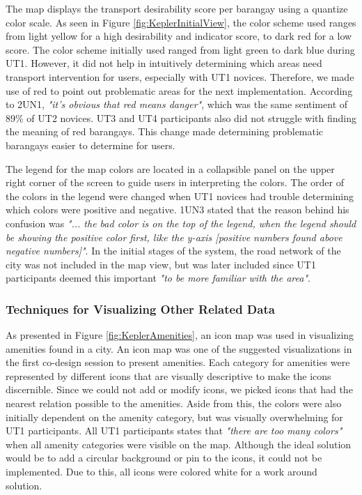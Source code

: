 \documentclass{sigchi}
\begin{document}
The map displays the transport desirability score per barangay using a quantize color scale. As seen in Figure \ref{fig:KeplerInitialView}, the color scheme used ranges from light yellow for a high desirability and indicator score, to dark red for a low score. The color scheme initially used ranged from light green to dark blue during UT1. However, it did not help in intuitively determining which areas need transport intervention for users, especially with UT1 novices. Therefore, we made use of red to point out problematic areas for the next implementation. According to 2UN1, \textit{"it's obvious that red means danger"}, which was the same sentiment of 89\% of UT2 novices. UT3 and UT4 participants also did not struggle with finding the meaning of red barangays. This change made determining problematic barangays easier to determine for users. 

The legend for the map colors are located in a collapsible panel on the upper right corner of the screen to guide users in interpreting the colors. The order of the colors in the legend were changed when UT1 novices had trouble determining which colors were positive and negative. 1UN3 stated that the reason behind his confusion was \textit{"... the bad color is on the top of the legend, when the legend should be showing the positive color first, like the y-axis [positive numbers found above negative numbers]"}. In the initial stages of the system, the road network of the city was not included in the map view, but was later included since UT1 participants deemed this important \textit{"to be more familiar with the area"}.

\subsubsection{Techniques for Visualizing Other Related Data}
As presented in Figure \ref{fig:KeplerAmenities}, an icon map was used in visualizing amenities found in a city. An icon map was one of the suggested visualizations in the first co-design session to present amenities. Each category for amenities were represented by different icons that are visually descriptive to make the icons discernible. Since we could not add or modify icons, we picked icons that had the nearest relation possible to the amenities. Aside from this, the colors were also initially dependent on the amenity category, but was visually overwhelming for UT1 participants. All UT1 participants states that \textit{"there are too many colors"} when all amenity categories were visible on the map. Although the ideal solution would be to add a circular background or pin to the icons, it could not be implemented. Due to this, all icons were colored white for a work around solution.
\end{document}

